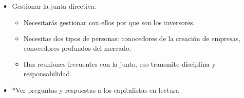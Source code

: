 \documentclass{article}
\begin{document}
\begin{itemize}
    \item Gestionar la junta directiva:
        \begin{itemize}
            \item Necesitarás gestionar con ellos por que son los inversores.
            \item Necesitas dos tipos de personas: conocedores de la creación de empresas, conocedores profundos del mercado.
            \item Haz reuniones frecuentes con la junta, eso transmite disciplina y responsabilidad.
        \end{itemize}
    
    \item *Ver preguntas y respuestas a los capitalistas en lectura
\end{itemize}
\end{document}
